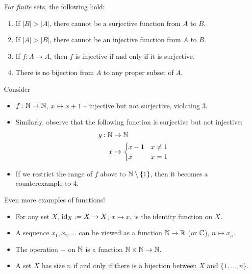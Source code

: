 \documentclass{../template/note}
\begin{document}
    \begin{remark*}
        For \emph{finite} sets, the following hold:
        \begin{enumerate}[label=\protect\circled{\arabic*}]
            \item If \(|B| > |A|\), there cannot be a surjective function from \(A\) to \(B\).
            \item If \(|A| > |B|\), there cannot be an injective function from \(A\) to \(B\).
            \item If \(f: A \to A\), then \(f\) is injective if and only if it is surjective.
            \item There is no bijection from \(A\) to any proper subset of \(A\).
        \end{enumerate}
        Consider
        \begin{itemize}
            \item \(f: \mathbb N \to \mathbb N\), \(x \mapsto x+1\) -- injective but not surjective, violating 3.
            \item Similarly, observe that the following function is surjective but not injective:
            \begin{align*}
                g: \mathbb N &\to \mathbb N \\
                x &\mapsto \begin{cases}
                    x-1 & x \neq 1 \\
                    x & x = 1
                \end{cases}
            \end{align*}
            \item If we restrict the range of \(f\) above to \(\mathbb N \setminus \{1\}\), then it becomes a counterexample to 4.
        \end{itemize}
        
    \end{remark*}
    
    \begin{example}
        Even more examples of functions!
        \begin{itemize}
            \item For any set \(X\), \(\operatorname{id}_X := X \to X\), \(x \mapsto x\), is the identity function on \(X\).
            \item A sequence \(x_1, x_2, \dots\) can be viewed as a function \(\mathbb N \to \mathbb R\) (or \(\mathbb C\)), \(n \mapsto x_n\).
            \item The operation \(+\) on \(\mathbb N\) is a function \(\mathbb N \times \mathbb N \to \mathbb N\).
            \item A set \(X\) has size \(n\) if and only if there is a bijection between \(X\) and \(\{1, \dots, n\}\).
        \end{itemize}
        
        
    \end{example}
    
\end{document}
